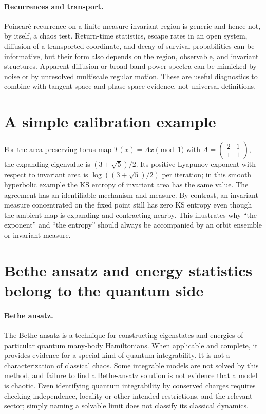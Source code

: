 \documentclass[11pt,a4paper]{article}
\begin{document}
\paragraph{Recurrences and transport.} Poincar\'e recurrence on a finite-measure invariant region is generic and hence not, by itself, a chaos test. Return-time statistics, escape rates in an open system, diffusion of a transported coordinate, and decay of survival probabilities can be informative, but their form also depends on the region, observable, and invariant structures. Apparent diffusion or broad-band power spectra can be mimicked by noise or by unresolved multiscale regular motion. These are useful diagnostics to combine with tangent-space and phase-space evidence, not universal definitions.

\section*{A simple calibration example}
For the area-preserving torus map $T(x)=Ax\pmod{1}$ with $A=\begin{pmatrix}2&1\\1&1\end{pmatrix}$, the expanding eigenvalue is $(3+\sqrt5)/2$. Its positive Lyapunov exponent with respect to invariant area is $\log((3+\sqrt5)/2)$ per iteration; in this smooth hyperbolic example the KS entropy of invariant area has the same value. The agreement has an identifiable mechanism and measure. By contrast, an invariant measure concentrated on the fixed point still has zero KS entropy even though the ambient map is expanding and contracting nearby. This illustrates why ``the exponent'' and ``the entropy'' should always be accompanied by an orbit ensemble or invariant measure.

\section*{Bethe ansatz and energy statistics belong to the quantum side}
\paragraph{Bethe ansatz.} The Bethe ansatz is a technique for constructing eigenstates and energies of particular quantum many-body Hamiltonians. When applicable and complete, it provides evidence for a special kind of quantum integrability. It is not a characterization of classical chaos. Some integrable models are not solved by this method, and failure to find a Bethe-ansatz solution is not evidence that a model is chaotic. Even identifying quantum integrability by conserved charges requires checking independence, locality or other intended restrictions, and the relevant sector; simply naming a solvable limit does not classify its classical dynamics.
\end{document}
